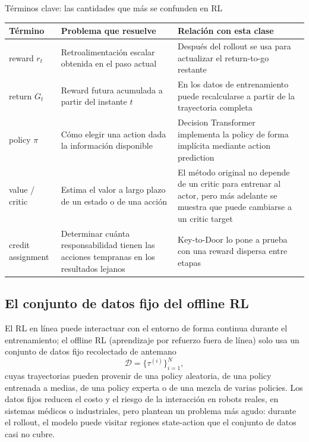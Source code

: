 \begin{knowledgebox}{Términos clave: las cantidades que más se confunden en RL}
\begin{tabularx}{\textwidth}{L{2.8cm} X X}
\toprule
Término & Problema que resuelve & Relación con esta clase \\
\midrule
reward $r_t$ & Retroalimentación escalar obtenida en el paso actual & Después del rollout se usa para actualizar el return-to-go restante \\
return $G_t$ & Reward futura acumulada a partir del instante $t$ & En los datos de entrenamiento puede recalcularse a partir de la trayectoria completa \\
policy $\pi$ & Cómo elegir una action dada la información disponible & Decision Transformer implementa la policy de forma implícita mediante action prediction \\
value / critic & Estima el valor a largo plazo de un estado o de una acción & El método original no depende de un critic para entrenar al actor, pero más adelante se muestra que puede cambiarse a un critic target \\
credit assignment & Determinar cuánta responsabilidad tienen las acciones tempranas en los resultados lejanos & Key-to-Door lo pone a prueba con una reward dispersa entre etapas \\
\bottomrule
\end{tabularx}
\end{knowledgebox}

\subsection{El conjunto de datos fijo del offline RL}

El RL en línea puede interactuar con el entorno de forma continua durante el entrenamiento; el offline RL (aprendizaje por refuerzo fuera de línea) solo usa un conjunto de datos fijo recolectado de antemano
\[
\mathcal{D}=\{\tau^{(i)}\}_{i=1}^{N},
\]
cuyas trayectorias pueden provenir de una policy aleatoria, de una policy entrenada a medias, de una policy experta o de una mezcla de varias policies. Los datos fijos reducen el costo y el riesgo de la interacción en robots reales, en sistemas médicos o industriales, pero plantean un problema más agudo: durante el rollout, el modelo puede visitar regiones state-action que el conjunto de datos casi no cubre.


